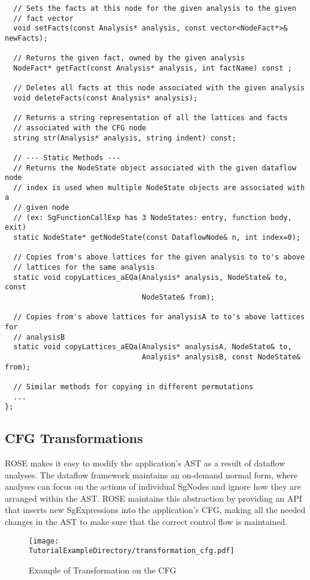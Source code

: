 {\begin{frame}
\begin{lstlisting}
  // Sets the facts at this node for the given analysis to the given 
  // fact vector
  void setFacts(const Analysis* analysis, const vector<NodeFact*>& newFacts);
  
  // Returns the given fact, owned by the given analysis
  NodeFact* getFact(const Analysis* analysis, int factName) const ;
  
  // Deletes all facts at this node associated with the given analysis
  void deleteFacts(const Analysis* analysis);

  // Returns a string representation of all the lattices and facts 
  // associated with the CFG node
  string str(Analysis* analysis, string indent) const;

  // --- Static Methods --- 
  // Returns the NodeState object associated with the given dataflow node
  // index is used when multiple NodeState objects are associated with a 
  // given node
  // (ex: SgFunctionCallExp has 3 NodeStates: entry, function body, exit)
  static NodeState* getNodeState(const DataflowNode& n, int index=0);
    
  // Copies from's above lattices for the given analysis to to's above 
  // lattices for the same analysis
  static void copyLattices_aEQa(Analysis* analysis, NodeState& to, const 
                                NodeState& from);
  
  // Copies from's above lattices for analysisA to to's above lattices for 
  // analysisB
  static void copyLattices_aEQa(Analysis* analysisA, NodeState& to, 
                                Analysis* analysisB, const NodeState& from);
  
  // Similar methods for copying in different permutations
  ...
};
\end{lstlisting}
\end{frame}

\subsection{CFG Transformations}
ROSE makes it easy to modify the application’s AST as a result of dataflow analyses. The dataflow framework maintains an on-demand normal form, where analyses can focus on the actions of individual SgNodes and ignore how they are arranged within the AST. ROSE maintains this abstraction by providing an API that inserts new SgExpressions into the application’s CFG, making all the needed changes in the AST to make sure that the correct control flow is maintained. 


\begin{figure}
\texttt{[image: \\TutorialExampleDirectory/transformation\_cfg.pdf]}
\caption{Example of Transformation on the CFG}
\label{tr_cfg}
\end{figure}

}
